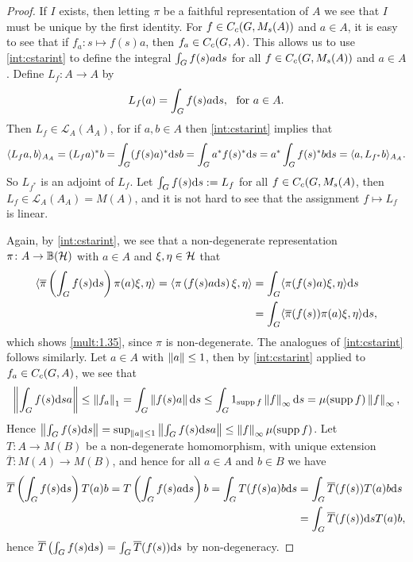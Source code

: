 \begin{proof}
If $I$ exists, then letting $\pi$ be a faithful representation of $A$ we see that $I$ must be unique by the first identity. For  $f \in C_c(G,M_s(A))$ and $a \in A$, it is easy to see that if $f_a \colon s \mapsto f(s) a$, then $f_a \in C_c(G,A)$. This allows us to use \cref{int:cstarint} to define the integral $\int_G f(s) a \mathrm{d} s$ for all $f \in C_c(G,M_s(A))$ and $a \in A$. Define $L_f \colon A \to A$ by
\begin{align*}
	L_f(a) = \int_G f(s) a \mathrm{d} s, \ \text{ for } a \in A.
\end{align*}
Then $L_f \in \mathcal{L}_A(A_A)$, for if $a,b \in A$ then \cref{int:cstarint} implies that
\begin{align*}
	\langle L_f a , b \rangle_{A_A} = (L_f a )^* b = \int_G (f(s) a)^* \mathrm{d} s b = \int_G a^* f(s)^* \mathrm{d} s = a^* \int_G f(s)^* b \mathrm{d} s = \langle a , L_{f^*} b\rangle_{A_A}.
\end{align*}
So $L_{f^*}$ is an adjoint of $L_f$. Let $\int_G f(s) \mathrm{d} s := L_f$ for all $f \in C_c(G,M_s(A)$, then $L_f \in \mathcal{L}_A(A_A) = M(A)$, and it is not hard to see that the assignment $f \mapsto L_f$ is linear.

Again, by \cref{int:cstarint}, we see that a non-degenerate representation $\pi \colon A \to \mathbb{B}(\mathcal{H})$ with $a \in A$ and $\xi, \eta \in \mathcal{H}$ that
\begin{align*}
	\langle \overline \pi \left( \int_G f(s) \mathrm{d} s \right) \pi(a) \xi , \eta \rangle =\langle \pi \left(f(s) a \mathrm{d} s \right) \xi , \eta \rangle &= \int_G \langle \pi(f(s) a) \xi , \eta \rangle \mathrm{d} s\\
	&= \int_G \langle \overline \pi (f(s)) \pi(a) \xi , \eta \rangle \mathrm{d} s,
\end{align*}
which shows \cref{mult:1.35}, since $\pi$ is non-degenerate. The analogues of \cref{int:cstarint} follows similarly. Let $a \in A$ with $\left\lVert a \right\rVert \leq 1$, then by \cref{int:cstarint} applied to $f_a \in C_c(G,A)$, we see that
\begin{align*}
	\left\lVert \int_G f(s) \mathrm{d} s a \right\rVert  \leq \left\lVert f_a \right\rVert_1 = \int_G \left\lVert f(s) a \right\rVert \mathrm{d} s \leq \int_G 1_{\operatorname{supp} f} \left\lVert f \right\rVert_{\infty} \mathrm{d} s = \mu(\operatorname{supp} f) \left\lVert f \right\rVert_{\infty},
\end{align*}
Hence $\left\lVert \int_G f(s) \mathrm{d} s \right\rVert = \sup_{\left\lVert a \right\rVert \leq 1} \left\lVert \int_G f(s) \mathrm{d} s a\right\rVert \leq \left\lVert f \right\rVert_{\infty} \mu(\operatorname{supp} f)$. Let $T \colon A \to M(B)$ be a non-degenerate homomorphism, with unique extension $\overline T \colon M(A) \to M(B)$, and hence for all $ a \in A$ and $b \in B$ we have
\begin{align*}
	\overline T\left(  \int_G f(s) \mathrm{d} s \right) T(a) b = T\left( \int_G f(s) a \mathrm{d} s  \right)b= \int_{G} T(f(s)a ) b \mathrm{d} s &= \int_G \overline T(f(s)) T(a)b \mathrm{d} s \\
	&=\int_G \overline T(f(s)) \mathrm{d} s T(a)b,
\end{align*}
hence $\overline T \left( \int_G f(s) \mathrm{d} s \right) = \int_G \overline T(f(s)) \mathrm{d} s$ by non-degeneracy.
\end{proof}
